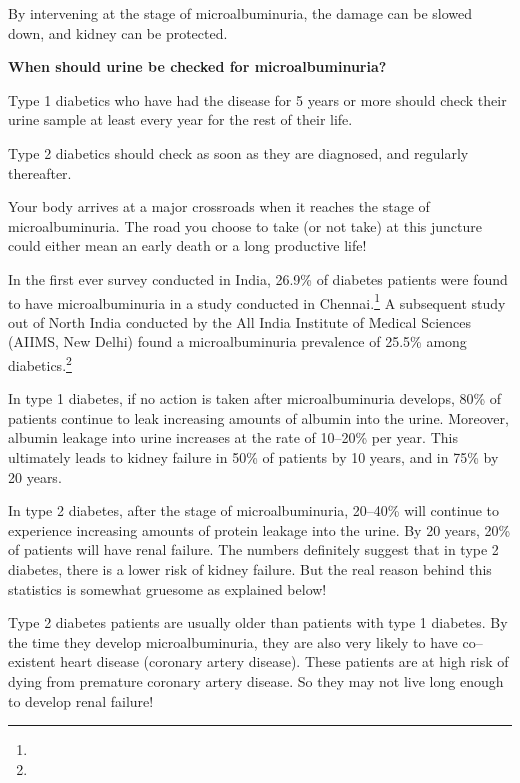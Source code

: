 By intervening at the stage of microalbuminuria, the damage can be slowed down, and kidney can be protected.

\textbf{When should urine be checked for microalbuminuria?}

Type 1 diabetics who have had the disease for 5 years or more should check their urine sample at least every year for the rest of their life.

Type 2 diabetics should check as soon as they are diagnosed, and regularly thereafter.


Your body arrives at a major crossroads when it reaches the stage of microalbuminuria. The road you choose to take (or not take) at this juncture could either mean an early death or a long productive life!

In the first ever survey conducted in India, 26.9\% of diabetes patients were found to have microalbuminuria in a study conducted in Chennai.\footnote{} A subsequent study out of North India conducted by the All India Institute of Medical Sciences (AIIMS, New Delhi) found a microalbuminuria prevalence of 25.5\% among diabetics.\footnote{}

In type 1 diabetes, if no action is taken after microalbuminuria develops, 80\% of patients continue to leak increasing amounts of albumin into the urine. Moreover, albumin leakage into urine increases at the rate of 10–20\% per year. This ultimately leads to kidney failure in 50\% of patients by 10 years, and in 75\% by 20 years.

In type 2 diabetes, after the stage of microalbuminuria, 20–40\% will continue to experience increasing amounts of protein leakage into the urine. By 20 years, 20\% of patients will have renal failure. The numbers definitely suggest that in type 2 diabetes, there is a lower risk of kidney failure. But the real reason behind this statistics is somewhat gruesome as explained below!

Type 2 diabetes patients are usually older than patients with type 1 diabetes. By the time they develop microalbuminuria, they are also very likely to have co–existent heart disease (coronary artery disease). These patients are at high risk of dying from premature coronary artery disease. So they may not live long enough to develop renal failure!

